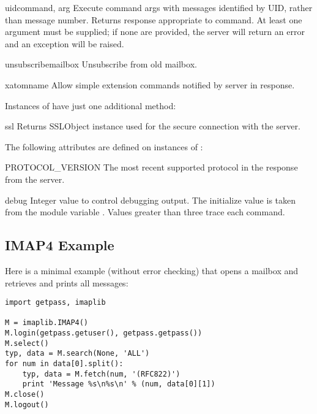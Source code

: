 \begin{methoddesc}{uid}{command, arg}
  Execute command args with messages identified by UID, rather than
  message number.  Returns response appropriate to command.  At least
  one argument must be supplied; if none are provided, the server will
  return an error and an exception will be raised.
\end{methoddesc}

\begin{methoddesc}{unsubscribe}{mailbox}
  Unsubscribe from old mailbox.
\end{methoddesc}

\begin{methoddesc}{xatom}{name}
  Allow simple extension commands notified by server in
   response.
\end{methoddesc}


Instances of  have just one additional method:

\begin{methoddesc}{ssl}{}
  Returns SSLObject instance used for the secure connection with the server.
\end{methoddesc}


The following attributes are defined on instances of :


\begin{memberdesc}{PROTOCOL_VERSION}
The most recent supported protocol in the
 response from the server.
\end{memberdesc}

\begin{memberdesc}{debug}
Integer value to control debugging output.  The initialize value is
taken from the module variable .  Values greater than
three trace each command.
\end{memberdesc}


\subsection{IMAP4 Example \label{imap4-example}}

Here is a minimal example (without error checking) that opens a
mailbox and retrieves and prints all messages:

\begin{verbatim}
import getpass, imaplib

M = imaplib.IMAP4()
M.login(getpass.getuser(), getpass.getpass())
M.select()
typ, data = M.search(None, 'ALL')
for num in data[0].split():
    typ, data = M.fetch(num, '(RFC822)')
    print 'Message %s\n%s\n' % (num, data[0][1])
M.close()
M.logout()
\end{verbatim}
